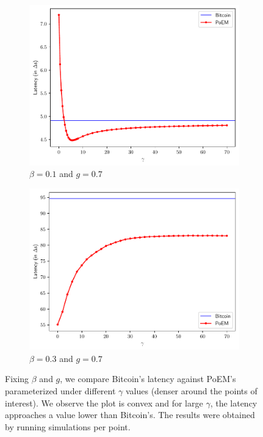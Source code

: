 \begin{figure}[h]
    \centering
    \begin{subfigure}{0.8\textwidth}
    \centering
    \includegraphics[width = \textwidth]{figures/gamma_latency_0.1.pdf}
    \caption{$\beta = 0.1$ and $g = 0.7$}
    \label{fig:gamma_latency_0.1}
    \end{subfigure}
    \begin{subfigure}{0.8\textwidth}
    \centering
    \includegraphics[width = \textwidth]{figures/gamma_latency_0.3.pdf}
    \caption{$\beta = 0.3$ and $g = 0.7$}
    \label{fig:gamma_latency_0.3}
    \end{subfigure}

  \caption{Fixing $\beta$ and $g$, we compare Bitcoin's latency against PoEM's parameterized under different $\gamma$ values
           (denser around the points of interest).
          We observe the plot is convex and for large $\gamma$, the latency
          approaches a value lower than Bitcoin's. The results were obtained by running \montecarlo{} simulations per point.}
    \label{fig:gamma_latency}
\end{figure}
